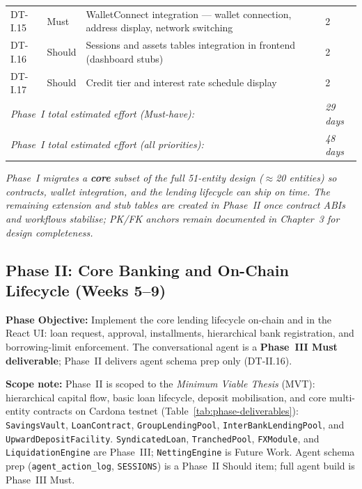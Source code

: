 \documentclass[12pt,a4paper]{report}
\begin{document}
\begin{table}[H]
\begin{tabular}{p{1.8cm}p{1.8cm}p{7.5cm}p{1.5cm}}
DT-I.15 & Must & WalletConnect integration --- wallet connection, address display, network switching & 2 \\
DT-I.16 & Should & Sessions and assets tables integration in frontend (dashboard stubs) & 2 \\
DT-I.17 & Should & Credit tier and interest rate schedule display & 2 \\
\multicolumn{3}{l}{\textit{Phase~I total estimated effort (Must-have):}} & \textit{29 days} \\
\multicolumn{3}{l}{\textit{Phase~I total estimated effort (all priorities):}} & \textit{48 days} \\
\bottomrule
\end{tabular}
\end{table}


\vspace{2pt}
\noindent\textit{\small Phase~I migrates a \textbf{core} subset of the full 51-entity design (\(\approx\)20 entities) so contracts, wallet integration, and the lending lifecycle can ship on time. The remaining extension and stub tables are created in Phase~II once contract ABIs and workflows stabilise; PK/FK anchors remain documented in Chapter~3 for design completeness.}

\subsection{Phase II: Core Banking and On-Chain Lifecycle (Weeks 5--9)}

\textbf{Phase Objective:} Implement the core lending lifecycle on-chain and in the React UI: loan request, approval, installments, hierarchical bank registration, and borrowing-limit enforcement. The conversational agent is a \textbf{Phase~III Must deliverable}; Phase~II delivers agent schema prep only (DT-II.16).

\textbf{Scope note:} Phase~II is scoped to the \textit{Minimum Viable Thesis} (MVT): hierarchical capital flow, basic loan lifecycle, deposit mobilisation, and core multi-entity contracts on Cardona testnet (Table~\ref{tab:phase-deliverables}): \texttt{SavingsVault}, \texttt{LoanContract}, \texttt{GroupLendingPool}, \texttt{InterBankLendingPool}, and \texttt{UpwardDepositFacility}. \texttt{SyndicatedLoan}, \texttt{TranchedPool}, \texttt{FXModule}, and \texttt{LiquidationEngine} are Phase~III; \texttt{NettingEngine} is Future Work. Agent schema prep (\texttt{agent\_action\_log}, \texttt{SESSIONS}) is a Phase~II Should item; full agent build is Phase~III Must.
\end{document}
